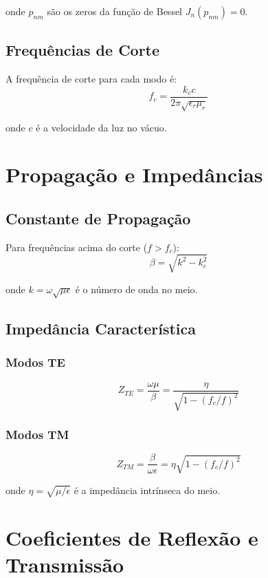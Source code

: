 \documentclass[a4paper,12pt]{article}
\begin{document}
onde $p_{nm}$ são os zeros da função de Bessel $J_n(p_{nm}) = 0$.

\subsection{Frequências de Corte}
A frequência de corte para cada modo é:
\begin{equation}
f_c = \frac{k_c c}{2\pi\sqrt{\epsilon_r \mu_r}}
\end{equation}

onde $c$ é a velocidade da luz no vácuo.

\section{Propagação e Impedâncias}

\subsection{Constante de Propagação}
Para frequências acima do corte ($f > f_c$):
\begin{equation}
\beta = \sqrt{k^2 - k_c^2}
\end{equation}

onde $k = \omega\sqrt{\mu\epsilon}$ é o número de onda no meio.

\subsection{Impedância Característica}

\subsubsection{Modos TE}
\begin{equation}
Z_{TE} = \frac{\omega\mu}{\beta} = \frac{\eta}{\sqrt{1 - (f_c/f)^2}}
\end{equation}

\subsubsection{Modos TM}
\begin{equation}
Z_{TM} = \frac{\beta}{\omega\epsilon} = \eta\sqrt{1 - (f_c/f)^2}
\end{equation}

onde $\eta = \sqrt{\mu/\epsilon}$ é a impedância intrínseca do meio.

\section{Coeficientes de Reflexão e Transmissão}
\end{document}
